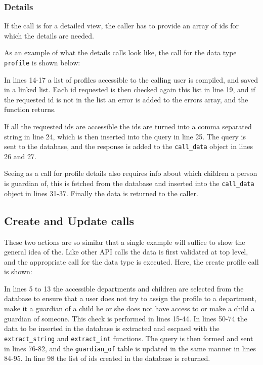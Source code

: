 \subsubsection{Details}
If the call is for a detailed view, the caller has to provide an array of ids for which the details are needed. 

As an example of what the details calls look like, the call for the data type \lstinline|profile| is shown below:



In lines 14-17 a list of profiles accessible to the calling user is compiled, and saved in a linked list. Each id requested is then checked again this list in line 19, and if the requested id is not in the list an error is added to the errors array, and the function returns.

If all the requested ids are accessible the ids are turned into a comma separated string in line 24, which is then inserted into the query in line 25. The query is sent to the database, and the response is added to the \lstinline|call_data| object in lines 26 and 27.

Seeing as a call for profile details also requires info about which children a person is guardian of, this is fetched from the database and inserted into the \lstinline|call_data| object in lines 31-37. Finally the data is returned to the caller.

\subsection{Create and Update calls}
These two actions are so similar that a single example will suffice to show the general idea of the. Like other API calls the data is first validated at top level, and the appropriate call for the data type is executed. Here, the create profile call is shown:



In lines 5 to 13 the accessible departments and children are selected from the database to ensure that a user does not try to assign the profile to a department, make it a guardian of a child he or she does not have access to or make a child a guardian of someone. This check is performed in lines 15-44. In lines 50-74 the data to be inserted in the database is extracted and escpaed with the \lstinline|extract_string| and \lstinline|extract_int| functions. The query is then formed and sent in lines 76-82, and the \lstinline|guardian_of| table is updated in the same manner in lines 84-95. In line 98 the list of ids created in the database is returned.